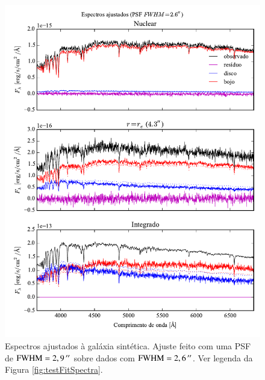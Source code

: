 \begin{figure}
	\includegraphics{figuras/simulation_spectra_psf26}
	\caption[Espectros ajustados (teste com PSF $\mathrm{FWHM} = 2,6\,\arcs$)]
	{Espectros ajustados à galáxia sintética. Ajuste feito com uma PSF de
	$\mathrm{FWHM} = 2,9\,^{\prime\prime}$ sobre dados com $\mathrm{FWHM} = 2,6\,\arcs$. Ver
	legenda da Figura \ref{fig:testFitSpectra}.}
	\label{fig:testFitSpectra26}
\end{figure}

